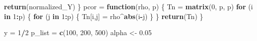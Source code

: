 \documentclass[
]{article}
\newenvironment{Shaded}{\begin{snugshade}}{\end{snugshade}}
\newcommand{\ControlFlowTok}[1]{\textcolor[rgb]{0.13,0.29,0.53}{\textbf{#1}}}
\newcommand{\DecValTok}[1]{\textcolor[rgb]{0.00,0.00,0.81}{#1}}
\newcommand{\FloatTok}[1]{\textcolor[rgb]{0.00,0.00,0.81}{#1}}
\newcommand{\FunctionTok}[1]{\textcolor[rgb]{0.13,0.29,0.53}{\textbf{#1}}}
\newcommand{\NormalTok}[1]{#1}
\newcommand{\OtherTok}[1]{\textcolor[rgb]{0.56,0.35,0.01}{#1}}
\newcommand{\SpecialCharTok}[1]{\textcolor[rgb]{0.81,0.36,0.00}{\textbf{#1}}}
\begin{document}
\begin{Shaded}
\begin{Highlighting}[]
  \FunctionTok{return}\NormalTok{(normalized\_Y)}
\NormalTok{\}}
\NormalTok{pcor }\OtherTok{=} \ControlFlowTok{function}\NormalTok{(rho, p) \{}
\NormalTok{  Tn }\OtherTok{=} \FunctionTok{matrix}\NormalTok{(}\DecValTok{0}\NormalTok{, p, p)}
  \ControlFlowTok{for}\NormalTok{ (i }\ControlFlowTok{in} \DecValTok{1}\SpecialCharTok{:}\NormalTok{p) \{}
    \ControlFlowTok{for}\NormalTok{ (j }\ControlFlowTok{in} \DecValTok{1}\SpecialCharTok{:}\NormalTok{p) \{}
\NormalTok{      Tn[i,j] }\OtherTok{=}\NormalTok{ rho}\SpecialCharTok{\^{}}\FunctionTok{abs}\NormalTok{(i}\SpecialCharTok{{-}}\NormalTok{j)}
\NormalTok{    \}}
\NormalTok{  \}}
  \FunctionTok{return}\NormalTok{(Tn)}
\NormalTok{\}}
\end{Highlighting}
\end{Shaded}

\begin{Shaded}
\begin{Highlighting}[]
\NormalTok{y }\OtherTok{=} \DecValTok{1}\SpecialCharTok{/}\DecValTok{2}
\NormalTok{p\_list }\OtherTok{=} \FunctionTok{c}\NormalTok{(}\DecValTok{100}\NormalTok{, }\DecValTok{200}\NormalTok{, }\DecValTok{500}\NormalTok{)}
\NormalTok{alpha }\OtherTok{\textless{}{-}} \FloatTok{0.05}
\end{Highlighting}
\end{Shaded}
\end{document}
